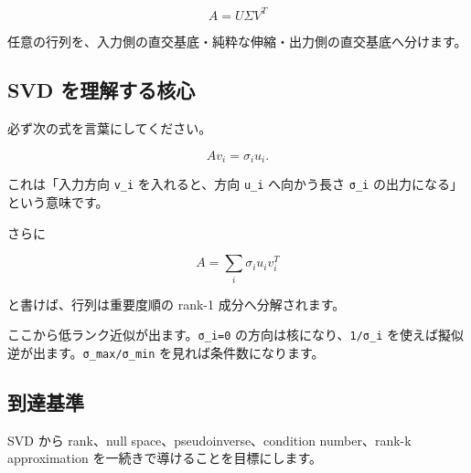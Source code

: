 \documentclass[
  11pt,
  a4paper,
]{ltjsarticle}
\begin{document}
\[
A=U\Sigma V^T
\]

任意の行列を、入力側の直交基底・純粋な伸縮・出力側の直交基底へ分けます。

\hypertarget{svd-ux3092ux7406ux89e3ux3059ux308bux6838ux5fc3}{%
\subsection{SVD
を理解する核心}\label{svd-ux3092ux7406ux89e3ux3059ux308bux6838ux5fc3}}

必ず次の式を言葉にしてください。

\[
Av_i=\sigma_i u_i.
\]

これは「入力方向 \texttt{v\_i} を入れると、方向 \texttt{u\_i}
へ向かう長さ \texttt{σ\_i} の出力になる」という意味です。

さらに

\[
A=\sum_i\sigma_i u_iv_i^T
\]

と書けば、行列は重要度順の rank-1 成分へ分解されます。

ここから低ランク近似が出ます。\texttt{σ\_i=0}
の方向は核になり、\texttt{1/σ\_i}
を使えば擬似逆が出ます。\texttt{σ\_max/σ\_min}
を見れば条件数になります。

\hypertarget{ux5230ux9054ux57faux6e96}{%
\subsection{到達基準}\label{ux5230ux9054ux57faux6e96}}

SVD から rank、null space、pseudoinverse、condition number、rank-k
approximation を一続きで導けることを目標にします。
\end{document}
